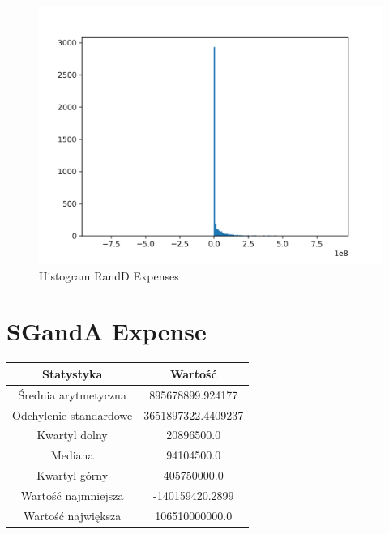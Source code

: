 \documentclass{article}
\begin{document}
\begin{figure}[h!]
    \includegraphics[width=\linewidth]{variables/R_D Expenses.png}
    \caption{Histogram RandD Expenses }
\end{figure}\section{ SGandA Expense }

\begin{center}
    \begin{tabular}{|c | c|} 
    \hline
    Statystyka & Wartość \\
    \hline\hline
    Średnia arytmetyczna & 895678899.924177 \\ 
    \hline
    Odchylenie standardowe & 3651897322.4409237 \\
    \hline
    Kwartyl dolny & 20896500.0 \\
    \hline
    Mediana & 94104500.0 \\
    \hline
    Kwartyl górny & 405750000.0 \\
    \hline
    Wartość najmniejsza & -140159420.2899 \\
    \hline
    Wartość największa & 106510000000.0 \\
    \hline
   \end{tabular}
\end{center}
\end{document}
